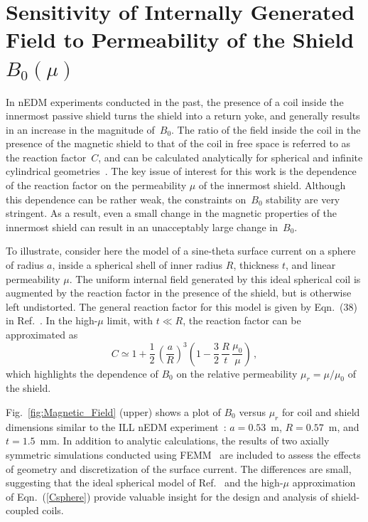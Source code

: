 

\section{Sensitivity of Internally Generated Field to Permeability of the Shield $B_0(\mu)$\label{sec:calculation}}

In nEDM experiments conducted in the past, the presence of a coil
inside the innermost passive shield turns the shield into a return
yoke, and generally results in an increase in the magnitude
of~$B_0$. The ratio of the field inside the coil in the presence of
the magnetic shield to that of the coil in free space is referred to
as the reaction factor~$C$, and can be calculated analytically for
spherical and infinite cylindrical
geometries~\cite{bidinosti2014passive,urankar1996design}. The key
issue of interest for this work is the dependence of the reaction
factor on the permeability $\mu$ of the innermost shield.  Although
this dependence can be rather weak, the constraints on~$B_0$ stability
are very stringent. As a result, even a small change in the magnetic
properties of the innermost shield can result in an unacceptably large
change in~$B_0$.


To illustrate, consider here the model of a sine-theta surface
current on a sphere of radius $a$, inside a spherical shell of inner
radius $R$, thickness $t$, and linear permeability $\mu$. The uniform
internal field generated by this ideal spherical coil is augmented by
the reaction factor in the presence of the shield, but is otherwise
left undistorted.  The general reaction factor for this model is given
by Eqn.~(38) in Ref.~\cite{bidinosti2014passive}.  In the high-$\mu$
limit, with $t\ll R$, the reaction factor can be approximated as
\begin{equation}
C 
 \simeq 1+ \frac{1}{2}\, \left( \frac{a}{R} \right)^{3} \left( 1- \frac{3}{2} \, \frac{R}{t} \, \frac{\mu_0}{\mu} \right) \, ,
 \label{Csphere}
\end{equation}
which highlights the dependence of $B_0$ on the relative permeability
$\mu_r=\mu/\mu_0$ of the shield.

Fig.~\ref{fig:Magnetic_Field} (upper) shows a plot of $B_0$ versus
$\mu_r$ for coil and shield dimensions similar to the ILL nEDM
experiment~\cite{Baker2006,knecht}: $a=0.53$~m, $R= 0.57$~m, and
$t=1.5$~mm.  In addition to analytic calculations, the results of two
axially symmetric simulations conducted using FEMM~\cite{femm} are
included to assess the effects of geometry and discretization of the
surface current. The differences are small, suggesting that the ideal
spherical model of Ref.~\cite{bidinosti2014passive} and the high-$\mu$
approximation of Eqn.~(\ref{Csphere}) provide valuable insight for the
design and analysis of shield-coupled coils.

